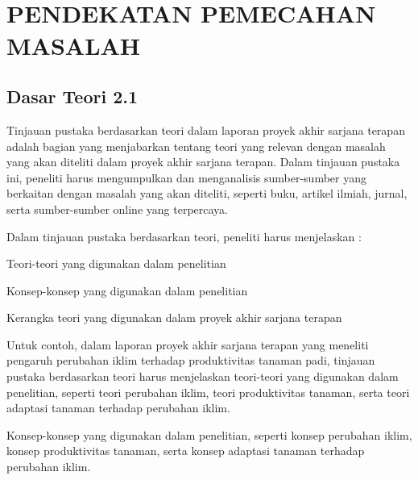 
\chapter[PENDEKATAN PEMECAHAN MASALAH]{\\ PENDEKATAN PEMECAHAN MASALAH}

\section{Dasar Teori 2.1}
Tinjauan pustaka berdasarkan teori dalam laporan proyek akhir sarjana terapan adalah bagian yang menjabarkan tentang teori yang relevan dengan masalah yang akan diteliti dalam proyek akhir sarjana terapan. Dalam tinjauan pustaka ini, peneliti harus mengumpulkan dan menganalisis sumber-sumber yang berkaitan dengan masalah yang akan diteliti, seperti buku, artikel ilmiah, jurnal, serta sumber-sumber online yang terpercaya.

Dalam tinjauan pustaka berdasarkan teori, peneliti harus menjelaskan :
\begin{packed_item}
    \item Teori-teori yang digunakan dalam penelitian
    \item Konsep-konsep yang digunakan dalam penelitian
    \item Kerangka teori yang digunakan dalam proyek akhir sarjana terapan
\end{packed_item}

Untuk contoh, dalam laporan proyek akhir sarjana terapan yang meneliti pengaruh perubahan iklim terhadap produktivitas tanaman padi, tinjauan pustaka berdasarkan teori harus menjelaskan teori-teori yang digunakan dalam penelitian, seperti teori perubahan iklim, teori produktivitas tanaman, serta teori adaptasi tanaman terhadap perubahan iklim.

Konsep-konsep yang digunakan dalam penelitian, seperti konsep perubahan iklim, konsep produktivitas tanaman, serta konsep adaptasi tanaman terhadap perubahan iklim.

